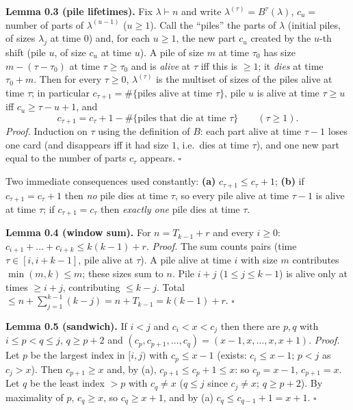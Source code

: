 \documentclass[11pt,a4paper]{article}
\begin{document}
\textbf{Lemma 0.3 (pile lifetimes).} Fix \(\lambda\vdash n\) and write
\(\lambda^{(\tau)}=B^{\tau}(\lambda)\), \(c_u=\) number of parts of
\(\lambda^{(u-1)}\) (\(u\ge1\)). Call the ``piles'' the parts of
\(\lambda\) (initial piles, of sizes \(\lambda_j\) at time \(0\)) and,
for each \(u\ge1\), the new part \(c_u\) created by the \(u\)-th shift
(pile \(u\), of size \(c_u\) at time \(u\)). A pile of size \(m\) at
time \(\tau_0\) has size \(m-(\tau-\tau_0)\) at time \(\tau\ge\tau_0\)
and is \emph{alive} at \(\tau\) iff this is \(\ge1\); it \emph{dies} at
time \(\tau_0+m\). Then for every \(\tau\ge0\), \(\lambda^{(\tau)}\) is
the multiset of sizes of the piles alive at time \(\tau\); in particular
\(c_{\tau+1}=\#\{\text{piles alive at time }\tau\}\), pile \(u\) is
alive at time \(\tau\ge u\) iff \(c_u\ge\tau-u+1\), and
\[c_{\tau+1}=c_\tau+1-\#\{\text{piles that die at time }\tau\}\qquad(\tau\ge1).\tag{0.3}\]
\emph{Proof.} Induction on \(\tau\) using the definition of \(B\): each
part alive at time \(\tau-1\) loses one card (and disappears iff it had
size \(1\), i.e.~dies at time \(\tau\)), and one new part equal to the
number of parts \(c_\tau\) appears. \(\square\)

Two immediate consequences used constantly: \textbf{(a)}
\(c_{\tau+1}\le c_\tau+1\); \textbf{(b)} if \(c_{\tau+1}=c_\tau+1\) then
\emph{no} pile dies at time \(\tau\), so every pile alive at time
\(\tau-1\) is alive at time \(\tau\); if \(c_{\tau+1}=c_\tau\) then
\emph{exactly one} pile dies at time \(\tau\).

\textbf{Lemma 0.4 (window sum).} For \(n=T_{k-1}+r\) and every
\(i\ge0\): \(c_{i+1}+\dots+c_{i+k}\le k(k-1)+r\). \emph{Proof.} The sum
counts pairs (time \(\tau\in[i,i+k-1]\), pile alive at \(\tau\)). A pile
alive at time \(i\) with size \(m\) contributes \(\min(m,k)\le m\);
these sizes sum to \(n\). Pile \(i+j\) (\(1\le j\le k-1\)) is alive only
at times \(\ge i+j\), contributing \(\le k-j\). Total
\(\le n+\sum_{j=1}^{k-1}(k-j)=n+T_{k-1}=k(k-1)+r\). \(\square\)

\textbf{Lemma 0.5 (sandwich).} If \(i<j\) and \(c_i<x<c_j\) then there
are \(p,q\) with \(i\le p<q\le j\), \(q\ge p+2\) and
\((c_p,c_{p+1},\dots,c_q)=(x-1,x,\dots,x,x+1)\). \emph{Proof.} Let \(p\)
be the largest index in \([i,j)\) with \(c_p\le x-1\) (exists:
\(c_i\le x-1\); \(p<j\) as \(c_j>x\)). Then \(c_{p+1}\ge x\) and, by
(a), \(c_{p+1}\le c_p+1\le x\): so \(c_p=x-1\), \(c_{p+1}=x\). Let \(q\)
be the least index \(>p\) with \(c_q\ne x\) (\(q\le j\) since
\(c_j\ne x\); \(q\ge p+2\)). By maximality of \(p\), \(c_q\ge x\), so
\(c_q\ge x+1\), and by (a) \(c_q\le c_{q-1}+1=x+1\). \(\square\)
\end{document}
